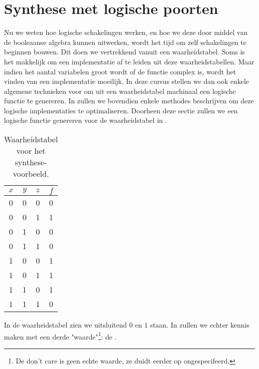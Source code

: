 \section{Synthese met logische poorten}
Nu we weten hoe logische schakelingen werken, en hoe we deze door middel van de booleaanse algebra kunnen uitwerken, wordt het tijd om zelf schakelingen te beginnen bouwen. Dit doen we vertrekkend vanuit een waarheidstabel. Soms is het makkelijk om een implementatie af te leiden uit deze waarheidstabellen. Maar indien het aantal variabelen groot wordt of de functie complex is, wordt het vinden van een implementatie moeilijk. In deze cursus stellen we dan ook enkele algemene technieken voor om uit een waarheidstabel machinaal een logische functie te genereren. In  zullen we bovendien enkele methodes beschrijven om deze logische implementaties te optimaliseren. Doorheen deze sectie zullen we een logische functie genereren voor de waarheidstabel in .
\begin{table}[htb]
\centering
\begin{tabular}{ccc|c}
$x$&$y$&$z$&$f$\\\hline
0&0&0&0\\
0&0&1&1\\
0&1&0&0\\
0&1&1&0\\
1&0&0&1\\
1&0&1&1\\
1&1&0&1\\
1&1&1&0\\
\end{tabular}
\caption{Waarheidstabel voor het synthese-voorbeeld.}
\end{table}
In de waarheidstabel zien we uitsluitend $0$ en $1$ staan. In  zullen we echter kennis maken met een derde "waarde"\footnote{De don't care is geen echte waarde, ze duidt eerder op ongespecifeerd.}: de .

